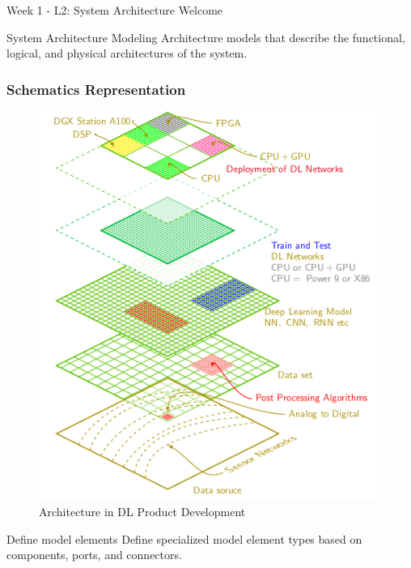 \begin{frame}
\begin{block}{ Week 1 - L2: System Architecture }
Welcome 
\end{block}
\end{frame}



\begin{frame}
\begin{block}{System Architecture Modeling}
Architecture models that describe the functional, logical, and physical architectures of the system. 
\end{block}
\end{frame}


\begin{frame}
\frametitle{Schematics Representation  }
\begin{figure}
\includegraphics[scale=0.36]{pic/Layers.png}
\caption{ Architecture in DL Product Development }
\label{Layer1}
\end{figure}
\end{frame}

\begin{frame}
\begin{block}{Define model elements  }
Define specialized model element types based on components, ports, and connectors. 
\end{block}
\end{frame}


